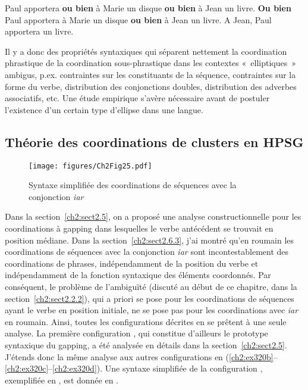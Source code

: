 \ea \label{ch2:ex319}
\ea Paul apportera \textbf{ou bien} à Marie un disque \textbf{ou bien} à Jean un livre. \label{ch2:ex319a} 
\ex \textbf{Ou bien} Paul apportera à Marie un disque \textbf{ou bien} à Jean un livre. \label{ch2:ex319b}
\ex A Jean, Paul apportera un livre. \label{ch2:ex319c}
\z
\z

Il y a donc des propriétés syntaxiques qui séparent nettement la coordination phrastique de la coordination sous-phrastique dans les contextes «~elliptiques~» ambigus, p.ex. contraintes sur les constituants de la séquence, contraintes sur la forme du verbe, distribution des conjonctions doubles, distribution des adverbes associatifs, etc. Une étude empirique s’avère nécessaire avant de postuler l’existence d’un certain type d’ellipse dans une langue.


\subsection{Théorie des coordinations de clusters en HPSG} \label{ch2:sect2.6.4}

\begin{figure}[b]
\texttt{[image: figures/Ch2Fig25.pdf]}%
\caption{Syntaxe simplifiée des coordinations de séquences avec la conjonction \textit{iar}}
\label{ch2:fig25}
\end{figure}

 
Dans la section~\ref{ch2:sect2.5}, on a proposé une analyse constructionnelle pour les coordinations à gapping dans lesquelles le verbe antécédent se trouvait en position médiane. Dans la section~\ref{ch2:sect2.6.3}, j’ai montré qu’en roumain les coordinations de séquences avec la conjonction \textit{iar} sont incontestablement des coordinations de phrases, indépendamment de la position du verbe et indépendamment de la fonction syntaxique des éléments coordonnés. Par conséquent, le problème de l’ambiguïté (discuté au début de ce chapitre, dans la section~\ref{ch2:sect2.2.2}), qui a priori se pose pour les coordinations de séquences ayant le verbe en position initiale, ne se pose pas pour les coordinations avec \textit{iar} en roumain. Ainsi, toutes les configurations décrites en  se prêtent à une seule analyse. La première configuration , qui constitue d’ailleurs le prototype syntaxique du gapping, a été analysée en détails dans la section~\ref{ch2:sect2.5}. J’étends donc la même analyse aux autres configurations en (\ref{ch2:ex320b}--\ref{ch2:ex320c}--\ref{ch2:ex320d}). Une syntaxe simplifiée de la configuration , exemplifiée en , est donnée en .   


